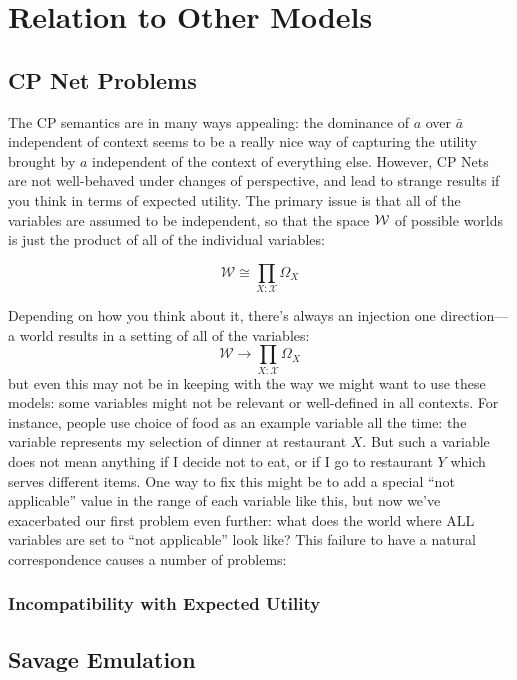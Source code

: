\documentclass{article}
\begin{document}
	
	\section{Relation to Other Models}
	
			
	\subsection{CP Net Problems}
	The CP semantics are in many ways appealing: the dominance of $a$ over $\bar a$ independent of context seems to be a really nice way of capturing the utility brought by $a$ independent of the context of everything else. However, CP Nets are not well-behaved under changes of perspective, and lead to strange results if you think in terms of expected utility. The primary issue is that all of the variables are assumed to be independent, so that the space $\cal W$ of possible worlds is just the product of all of the individual variables:
	
	\[ \mathcal W \cong \prod_{X: \mathcal X} \Omega_X \] 
	
	Depending on how you think about it, there's always an injection one direction--- a world results in a setting of all of the variables:
	\[ \mathcal W \to \prod_{X: \mathcal X} \Omega_X \] 
	but even this may not be in keeping with the way we might want to use these models: some variables might not be relevant or well-defined in all contexts. For instance, people use choice of food as an example variable all the time: the variable represents my selection of dinner at restaurant $X$. But such a variable does not mean anything if I decide not to eat, or if I go to restaurant $Y$ which serves different items. One way to fix this might be to add a special ``not applicable'' value in the range of each variable like this, but now we've exacerbated our first problem even further: what does the world where ALL variables are set to ``not applicable'' look like? This failure to have a natural correspondence causes a number of problems:
	
	\subsubsection{Incompatibility with Expected Utility}
	
	\subsection{Savage Emulation}
	
	\printbibliography
	
\end{document}
